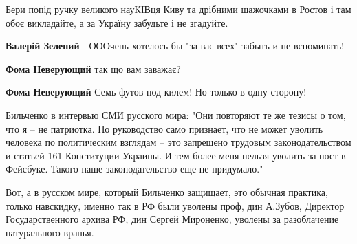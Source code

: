 \begin{itemize}
 
Бери попід ручку великого науКІВця Киву та дрібними шажочками в Ростов і там обоє викладайте, а за Україну забудьте і не згадуйте.

\begin{itemize}
 
\textbf{Валерій Зелений} - ОООчень хотелось бы "за вас всех" забыть и не вспоминать!

 
\textbf{Фома Неверующий} так що вам заважає?

 
\textbf{Фома Неверующий} Семь футов под килем! Но только в одну сторону!
\end{itemize}

 

Бильченко в интервью СМИ русского мира: "Они повторяют те же тезисы о том, что
я – не патриотка. Но руководство само признает, что не может уволить человека
по политическим взглядам – это запрещено трудовым законодательством и статьей
161 Конституции Украины. И тем более меня нельзя уволить за пост в Фейсбуке.
Такого наше законодательство еще не придумало."

Вот, а в русском мире, который Бильченко защищает, это обычная практика, только
навскидку, именно так в РФ были уволены проф, дин А.Зубов, Директор
Государственного архива РФ, дин Сергей Мироненко, уволены за разоблачение
натурального вранья.


\end{itemize}
